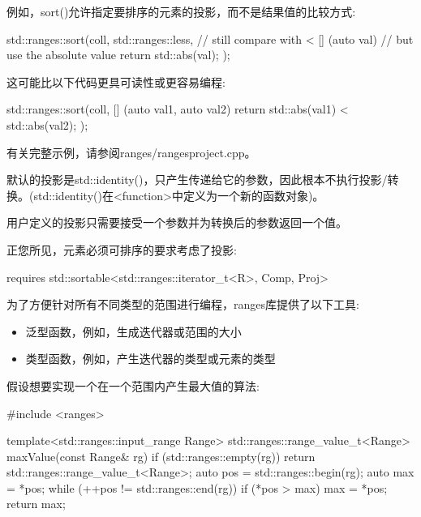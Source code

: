 例如，sort()允许指定要排序的元素的投影，而不是结果值的比较方式:

\begin{cpp}
std::ranges::sort(coll,
				std::ranges::less{}, // still compare with <
				[] (auto val) { // but use the absolute value
					return std::abs(val);
				});
\end{cpp}

这可能比以下代码更具可读性或更容易编程:

\begin{cpp}
std::ranges::sort(coll,
				[] (auto val1, auto val2) {
					return std::abs(val1) < std::abs(val2);
				});
\end{cpp}

有关完整示例，请参阅ranges/rangesproject.cpp。

默认的投影是std::identity()，只产生传递给它的参数，因此根本不执行投影/转换。(std::identity()在<function>中定义为一个新的函数对象)。

用户定义的投影只需要接受一个参数并为转换后的参数返回一个值。

正您所见，元素必须可排序的要求考虑了投影:

\begin{cpp}
requires std::sortable<std::ranges::iterator_t<R>, Comp, Proj>
\end{cpp}


为了方便针对所有不同类型的范围进行编程，ranges库提供了以下工具:

\begin{itemize}
\item
泛型函数，例如，生成迭代器或范围的大小

\item
类型函数，例如，产生迭代器的类型或元素的类型
\end{itemize}

假设想要实现一个在一个范围内产生最大值的算法:


\begin{cpp}
#include <ranges>

template<std::ranges::input_range Range>
std::ranges::range_value_t<Range> maxValue(const Range& rg)
{
	if (std::ranges::empty(rg)) {
		return std::ranges::range_value_t<Range>{};
	}
	auto pos = std::ranges::begin(rg);
	auto max = *pos;
	while (++pos != std::ranges::end(rg)) {
		if (*pos > max) {
			max = *pos;
		}
	}
	return max;
}
\end{cpp}

